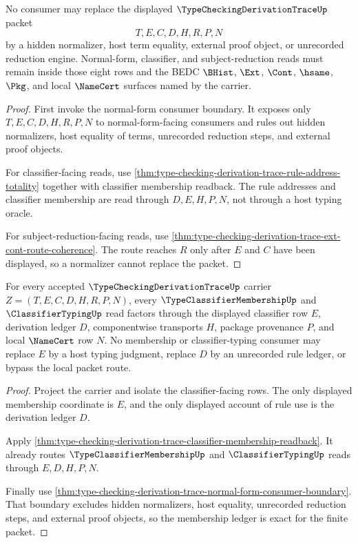 \begin{theorem}
\label{thm:type-checking-derivation-trace-normalizer-refusal}
No consumer may replace the displayed $\TypeCheckingDerivationTraceUp$ packet
$$
T,E,C,D,H,R,P,N
$$
by a hidden normalizer, host term equality, external proof object, or unrecorded reduction engine. Normal-form, classifier, and subject-reduction reads must remain inside those eight rows and the BEDC $\BHist$, $\Ext$, $\Cont$, $\hsame$, $\Pkg$, and local $\NameCert$ surfaces named by the carrier.
\end{theorem}
\begin{proof}
First invoke the normal-form consumer boundary. It exposes only $T,E,C,D,H,R,P,N$ to normal-form-facing consumers and rules out hidden normalizers, host equality of terms, unrecorded reduction steps, and external proof objects.

For classifier-facing reads, use \autoref{thm:type-checking-derivation-trace-rule-address-totality} together with classifier membership readback. The rule addresses and classifier membership are read through $D,E,H,P,N$, not through a host typing oracle.

For subject-reduction-facing reads, use \autoref{thm:type-checking-derivation-trace-ext-cont-route-coherence}. The route reaches $R$ only after $E$ and $C$ have been displayed, so a normalizer cannot replace the packet.
\end{proof}

\begin{theorem}
\label{thm:type-checking-derivation-trace-membership-ledger-exactness}
For every accepted $\TypeCheckingDerivationTraceUp$ carrier $Z=(T,E,C,D,H,R,P,N)$, every $\TypeClassifierMembershipUp$ and $\ClassifierTypingUp$ read factors through the displayed classifier row $E$, derivation ledger $D$, componentwise transports $H$, package provenance $P$, and local $\NameCert$ row $N$. No membership or classifier-typing consumer may replace $E$ by a host typing judgment, replace $D$ by an unrecorded rule ledger, or bypass the local packet route.
\end{theorem}
\begin{proof}
Project the carrier and isolate the classifier-facing rows. The only displayed membership coordinate is $E$, and the only displayed account of rule use is the derivation ledger $D$.

Apply \autoref{thm:type-checking-derivation-trace-classifier-membership-readback}. It already routes $\TypeClassifierMembershipUp$ and $\ClassifierTypingUp$ reads through $E,D,H,P,N$.

Finally use \autoref{thm:type-checking-derivation-trace-normal-form-consumer-boundary}. That boundary excludes hidden normalizers, host equality, unrecorded reduction steps, and external proof objects, so the membership ledger is exact for the finite packet.
\end{proof}

